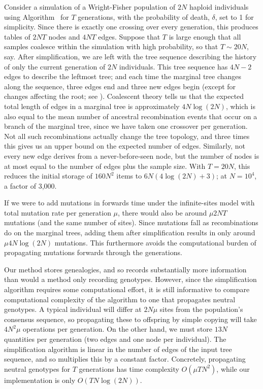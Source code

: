 \documentclass{article}
\begin{document}
Consider a simulation of a Wright-Fisher population of $2N$ haploid individuals 
using Algorithm~
for $T$ generations,
with the probability of death, $\delta$, set to 1 for simplicity.
Since there is exactly one crossing over every generation,
this produces tables of 
$2NT$ nodes and
$4NT$ edges.
Suppose that $T$ is large enough that all samples coalesce within the simulation with high probability,
so that $T \sim 20N$, say.
After simplification, we are left with the tree sequence describing the history
of only the current generation of $2N$ individuals.
This tree sequence has $4N-2$ edges to describe the leftmost tree;
and each time the marginal tree changes along the sequence,
three edges end and three new edges begin (except for changes affecting the root; see \citet{kelleher2016efficient}).
Coalescent theory tells us that 
the expected total length of edges in a marginal tree is approximately $4N\log(2N)$,
which is also equal to the mean number of ancestral recombination events that occur on a branch of the marginal tree,
since we have taken one crossover per generation.
Not all such recombinations actually change the tree topology,
and three times this gives us an upper bound on the expected number of edges.
Similarly, not every new edge derives from a never-before-seen node,
but the number of nodes is at most equal to the number of edges plus the sample size.
With $T=20N$, this reduces the initial storage of $160 N^2$ items to $6N(4\log(2N) + 3)$;
at $N=10^4$, a factor of 3,000.

If we were to add mutations in forwards time 
under the infinite-sites model with total mutation rate per generation $\mu$,
there would also be around $\mu 2NT$ mutations (and the same number of sites).
Since mutations fall as recombinations do on the marginal trees,
adding them after simplification results in only around $\mu 4 N \log(2N)$ mutations.
This furthermore avoids the computational burden of propagating mutations forwards through the generations.

Our method stores genealogies, and so records substantially more information 
than would a method only recording genotypes.
However, since the simplification algorithm requires some computational effort,
it is still informative to compare computational complexity of the algorithm
to one that propagates neutral genotypes.
A typical individual will differ at $2 N \mu$ sites from the population's consensus sequence,
so propagating these to offspring by simple copying will take $4 N^2 \mu$ operations per generation.
On the other hand, we must store $13N$ quantities per generation (two edges and one node per individual).
The simplification algorithm is linear in the number of edges of the input tree sequence,
and so multiplies this by a constant factor.
Concretely, propagating neutral genotypes for $T$ generations has time complexity $O(\mu T N^2)$,
while our implementation is only $O(T N \log(2N))$.
\end{document}
